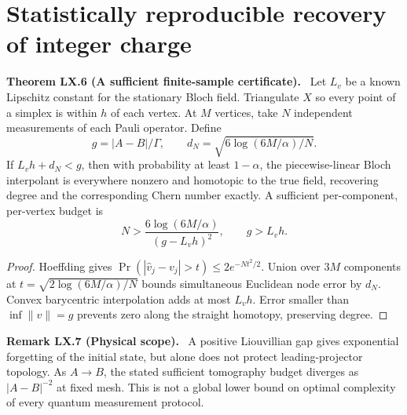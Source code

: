 \documentclass[11pt,a4paper,oneside]{book}
\newcommand{\statement}[3]{\par\medskip\noindent\textbf{#1 #2 (#3).}\ }
\begin{document}
\section{Statistically reproducible recovery of integer charge}
\statement{Theorem}{LX.6}{A sufficient finite-sample certificate}
Let $L_v$ be a known Lipschitz constant for the stationary Bloch field. Triangulate $X$ so every point of a simplex is within $h$ of each vertex. At $M$ vertices, take $N$ independent measurements of each Pauli operator. Define
\[g=|A-B|/\Gamma,\qquad d_N=\sqrt{6\log(6M/\alpha)/N}.\]
If $L_vh+d_N<g$, then with probability at least $1-\alpha$, the piecewise-linear Bloch interpolant is everywhere nonzero and homotopic to the true field, recovering degree and the corresponding Chern number exactly. A sufficient per-component, per-vertex budget is
\[N>\frac{6\log(6M/\alpha)}{(g-L_vh)^2},\qquad g>L_vh.\]
\begin{proof}
Hoeffding gives $\Pr(|\widehat v_j-v_j|>t)\le2e^{-Nt^2/2}$. Union over $3M$ components at $t=\sqrt{2\log(6M/\alpha)/N}$ bounds simultaneous Euclidean node error by $d_N$. Convex barycentric interpolation adds at most $L_vh$. Error smaller than $\inf\|v\|=g$ prevents zero along the straight homotopy, preserving degree.
\end{proof}
\statement{Remark}{LX.7}{Physical scope}
A positive Liouvillian gap gives exponential forgetting of the initial state, but alone does not protect leading-projector topology. As $A\to B$, the stated sufficient tomography budget diverges as $|A-B|^{-2}$ at fixed mesh. This is not a global lower bound on optimal complexity of every quantum measurement protocol.
\end{document}
